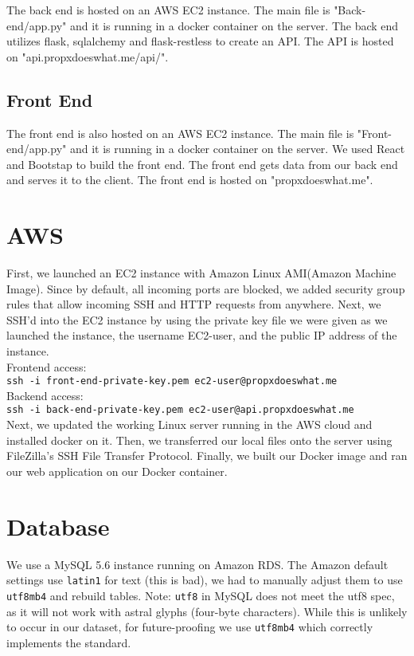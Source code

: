 \documentclass[12pt]{article}
\newcommand{\code}[1]{\texttt{#1}}
\begin{document}
The back end is hosted on an AWS EC2 instance. The main file is "Back-end/app.py" and it is running in a docker container on the server. The back end utilizes flask, sqlalchemy and flask-restless to create an API. The API is hosted on "api.propxdoeswhat.me/api/".

\subsection{Front End}

The front end is also hosted on an AWS EC2 instance. The main file is "Front-end/app.py" and it is running in a docker container on the server. We used React and Bootstap to build the front end. The front end gets data from our back end and serves it to the client. The front end is hosted on "propxdoeswhat.me".

\section{AWS}

First, we launched an EC2 instance with Amazon Linux AMI(Amazon Machine Image). Since by default, all incoming ports are blocked, we added security group rules that allow incoming SSH and HTTP requests from anywhere. Next, we SSH'd into the EC2 instance by using the private key file we were given as we launched the instance, the username EC2-user, and the public IP address of the instance. \\

Frontend access: \\
\code{ssh -i front-end-private-key.pem ec2-user@propxdoeswhat.me} \\
Backend access: \\
\code{ssh -i back-end-private-key.pem ec2-user@api.propxdoeswhat.me} \\

Next, we updated the working Linux server running in the AWS cloud and installed docker on it. Then, we transferred our local files onto the server using FileZilla's SSH File Transfer Protocol. Finally, we built our Docker image and ran our web application on our Docker container.

\section{Database}

We use a MySQL 5.6 instance running on Amazon RDS. The Amazon default settings use \code{latin1} for text (this is bad), we had to manually adjust them to use \code{utf8mb4} and rebuild tables. Note: \code{utf8} in MySQL does not meet the utf8 spec, as it will not work with astral glyphs (four-byte characters). While this is unlikely to occur in our dataset, for future-proofing we use \code{utf8mb4} which correctly implements the standard. 
\end{document}
